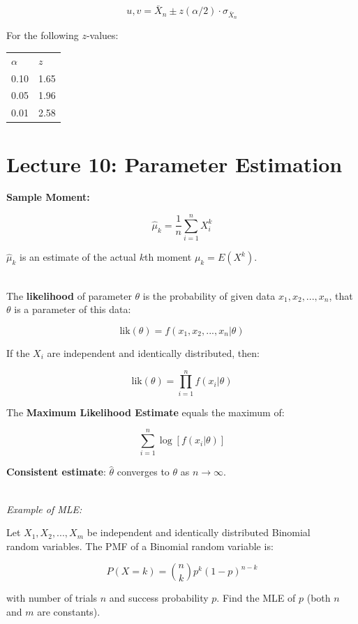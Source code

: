 \documentclass[12pt]{article}
\begin{document}
\[ u, v = \bar{X}_n \pm z(\alpha / 2) \cdot \sigma_{\bar{X}_n} \]

\noindent
For the following $z$-values:

\begin{table}[h]
    \centering
    \begin{tabular}{ll}
    $\alpha$ & $z$ \\
    0.10 & 1.65 \\
    0.05 & 1.96 \\
    0.01 & 2.58
    \end{tabular}
\end{table}

%
%
\newpage
\section*{Lecture 10: Parameter Estimation}
\textbf{Sample Moment:}

\[ \hat{\mu}_k = \frac{1}{n} \sum_{i = 1}^{n} X^k_i \]

\noindent
$\hat{\mu}_k$ is an estimate of the actual $k$th moment $\mu_k = E(X^k)$.

\noindent
\\
The \textbf{likelihood} of parameter $\theta$ is the probability of given data $x_1, x_2, ... , x_n$, that $\theta$ is a parameter of this data:

\[ \text{lik}(\theta) = f(x_1, x_2, ... , x_n | \theta) \]

\noindent
If the $X_i$ are independent and identically distributed, then:

\[ \text{lik}(\theta) = \prod_{i = 1}^{n} f(x_i | \theta) \]

\noindent
The \textbf{Maximum Likelihood Estimate} equals the maximum of:

\[ \sum_{i = 1}^{n} \log \left[ f(x_i | \theta) \right] \]

\noindent
\textbf{Consistent estimate}: $\hat{\theta}$ converges to $\theta$ as $n \rightarrow \infty$.

\noindent
\\
\textit{Example of MLE:}

\noindent
Let $X_1, X_2, ... , X_m$ be independent and identically distributed Binomial \\random variables.
The PMF of a Binomial random variable is:

\[ P(X = k) = \binom{n}{k} p^k (1 - p)^{n-k} \]

\noindent
with number of trials $n$ and success probability $p$.
Find the MLE of $p$ (both $n$ and $m$ are constants).
\end{document}
